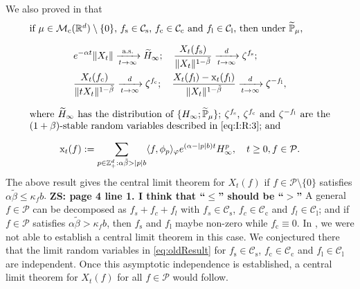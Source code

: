 \documentclass[12pt,a4paper]{amsart}
\theoremstyle{plain}
\theoremstyle{definition}
\numberwithin{equation}{section}
\begin{document}
	We also proved in \cite[Theorem 1.6]{RenSongSunZhao2019Stable} that
	\begin{equation}\label{eq:oldResult}
\begin{minipage}{0.9\textwidth}
	if $\mu\in \mathcal M_\mathrm c(\mathbb R^d)\setminus \{0\}$, $f_\mathrm s\in \mathcal C_\mathrm s$, $f_\mathrm c \in \mathcal C_\mathrm c$ and $f_\mathrm l \in \mathcal C_\mathrm l$, then under $\mathbb {\widetilde P}_\mu$,
\[
\begin{split}
	&e^{-\alpha t}\|X_t\| \xrightarrow[t\to \infty]{\text{a.s.}} \widetilde{H}_\infty;
	\quad \frac{X_t(f_\mathrm s)}{\|X_t\|^{1-\tilde \beta}} \xrightarrow[t\to \infty]{d} \zeta^{f_\mathrm s};
	\\&\frac{X_t(f_\mathrm c)}{\|t X_t\|^{1-\tilde \beta} } \xrightarrow[t\to \infty]{d} \zeta^{f_\mathrm c};
	\quad\frac{X_t(f_\mathrm l) - \mathrm x_t(f_\mathrm l)}{\|X_t\|^{1-\tilde \beta}}
	\xrightarrow[t\to \infty]{d} \zeta^{-f_\mathrm l},
\end{split}
\]
	where $\widetilde H_\infty$ has the distribution of $\{H_{\infty}; \widetilde {\mathbb P}_\mu\}$;
	$\zeta^{f_\mathrm s}$, $\zeta^{f_\mathrm c}$ and $\zeta^{-f_\mathrm l}$ are the $(1+\beta)$-stable random variables described in \eqref{eq:I:R:3}; and
\[
	\mathrm x_t(f)
	:= \sum_{p\in \mathbb Z^d_+:\alpha \tilde \beta>|p|b}\langle f,\phi_p\rangle_\varphi e^{(\alpha-|p|b)t}H^p_{\infty},
	\quad t\geq 0, f\in \mathcal P.
\]
\end{minipage}
\end{equation}
	The above result gives the central limit theorem for $X_t(f)$ if $f\in \mathcal P\setminus\{0\}$ satisfies $\alpha \tilde \beta \leq \kappa_f b$.
{\bf ZS: page 4 line 1. I think that “$\leq$” should be “$>$”}
	A general  $f \in \mathcal P$ can be decomposed as $f_s + f_c + f_l$ with $f_s \in \mathcal C_\mathrm s$, $f_c \in \mathcal C_\mathrm c$ and $f_l \in \mathcal C_\mathrm l$;
  and if $f\in  \mathcal P$ satisfies $\alpha \tilde \beta > \kappa_f b$, then $f_\mathrm s$ and $f_\mathrm l$ maybe non-zero while $f_\mathrm c \equiv 0$.
	In \cite{RenSongSunZhao2019Stable}, we were not able to establish a central limit theorem in this case. We conjectured there that the limit random variables in \eqref{eq:oldResult} for $f_\mathrm s\in \mathcal C_\mathrm s$, $f_\mathrm c\in \mathcal C_\mathrm c$ and $f_\mathrm l\in \mathcal C_\mathrm l$ are independent.
	Once this asymptotic independence is established, a central limit theorem  for $ X_t(f)$ for all $f\in  \mathcal P$ would follow.
\end{document}
